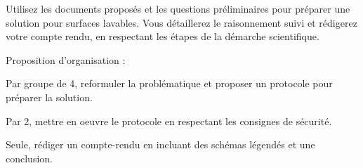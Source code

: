 




\mesure
Utilisez les documents proposés et les questions préliminaires pour préparer une solution pour surfaces lavables.
Vous détaillerez le raisonnement suivi et rédigerez votre compte rendu, en respectant les étapes de la démarche scientifique.
  
\chevron[couleurSec] Proposition d’organisation :
\begin{protocole}
  \item Par groupe de 4, reformuler la problématique et proposer un protocole pour préparer la solution.
  \item Par 2, mettre en oeuvre le protocole en respectant les consignes de sécurité.
  \item Seule, rédiger un compte-rendu en incluant des schémas légendés et une conclusion.
\end{protocole}